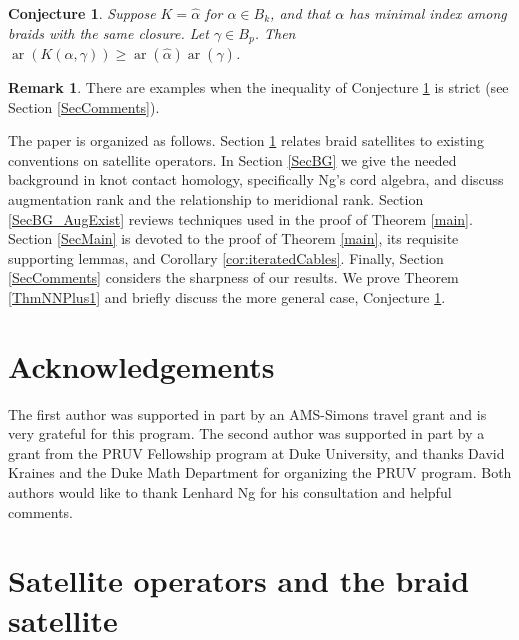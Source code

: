 \documentclass[11pt]{amsart}
\def\ar{\operatorname{ar}}
\newtheorem{conj}[thm]{Conjecture}
\theoremstyle{definition}
\newtheorem{rem}[thm]{Remark}
\begin{document}
\begin{conj}Suppose $K=\hat{\alpha}$ for $\alpha\in B_k$, and that $\alpha$ has minimal index among braids with the same closure. Let $\gamma\in B_p$. Then $\ar(K(\alpha,\gamma)) \ge \ar(\hat{\alpha})\ar(\hat{\gamma})$.
\label{ConjSuperMultipl}
\end{conj}

\begin{rem}There are examples when the inequality of Conjecture \ref{ConjSuperMultipl} is strict (see Section \ref{SecComments}).
\label{RemStrictlySuper}
\end{rem}

The paper is organized as follows. Section \ref{SecAsSatelliteOp} relates braid satellites to existing conventions on satellite operators. In Section \ref{SecBG} we give the needed background in knot contact homology, specifically Ng's cord algebra, and discuss augmentation rank and the relationship to meridional rank. Section \ref{SecBG_AugExist} reviews techniques used in the proof of Theorem \ref{main}. Section \ref{SecMain} is devoted to the proof of Theorem \ref{main}, its requisite supporting lemmas, and Corollary \ref{cor:iteratedCables}. Finally, Section \ref{SecComments} considers the sharpness of our results. We prove Theorem \ref{ThmNNPlus1} and briefly discuss the more general case, Conjecture \ref{ConjSuperMultipl}.



\section*{Acknowledgements}
The first author was supported in part by an AMS-Simons travel grant and is very grateful for this program. The second author was supported in part by a grant from the PRUV Fellowship program at Duke University, and thanks David Kraines and the Duke Math Department for organizing the PRUV program. Both authors would like to thank Lenhard Ng for his consultation and helpful comments.




\section{Satellite operators and the braid satellite}
\label{SecAsSatelliteOp}
\end{document}
